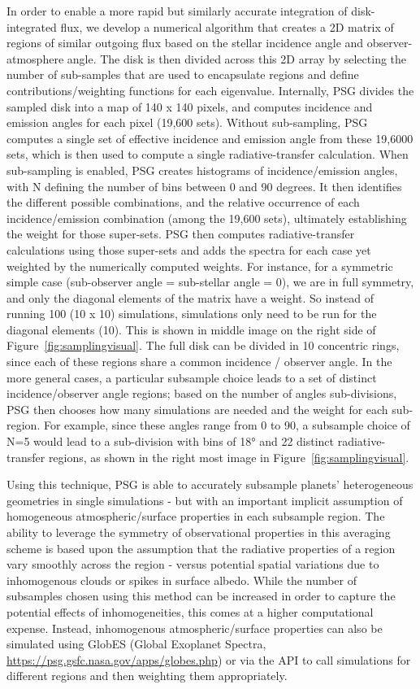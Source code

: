\documentclass[12pt, letterpaper]{aastex631}
\begin{document}
 In order to enable a more rapid but similarly accurate integration of disk-integrated flux, we develop a numerical algorithm that creates a 2D matrix of regions of similar outgoing flux based on the stellar incidence angle and observer-atmosphere angle. The disk is then divided across this 2D array by selecting the number of sub-samples that are used to encapsulate regions and define contributions/weighting functions for each eigenvalue. Internally, PSG divides the sampled disk into a map of 140 x 140 pixels, and computes incidence and emission angles for each pixel (19,600 sets). Without sub-sampling, PSG computes a single set of effective incidence and emission angle from these 19,6000 sets, which is then used to compute a single radiative-transfer calculation. When sub-sampling is enabled, PSG creates histograms of incidence/emission angles, with N defining the number of bins between 0 and 90 degrees. It then identifies the different possible combinations, and the relative occurrence of each incidence/emission combination (among the 19,600 sets), ultimately establishing the weight for those super-sets. PSG then computes radiative-transfer calculations using those super-sets and adds the spectra for each case yet weighted by the numerically computed weights. For instance, for a symmetric simple case (sub-observer angle = sub-stellar angle = 0), we are in full symmetry, and only the diagonal elements of the matrix have a weight. So instead of running 100 (10 x 10) simulations, simulations only need to be run for the diagonal elements (10). This is shown in middle image on the right side of Figure~\ref{fig:samplingvisual}. The full disk can be divided in 10 concentric rings, since each of these regions share a common incidence / observer angle.  In the more general cases, a particular subsample choice leads to a set of distinct incidence/observer angle regions; based on the number of angles sub-divisions, PSG then chooses how many simulations are needed and the weight for each sub-region. For example, since these angles range from 0 to 90, a subsample choice of N=5 would lead to a sub-division with bins of 18° and 22 distinct radiative-transfer regions, as shown in the right most image in Figure~\ref{fig:samplingvisual}.  
 
 Using this technique, PSG is able to accurately subsample planets' heterogeneous geometries in single simulations - but with an important implicit assumption of homogeneous atmospheric/surface properties in each subsample region.  The ability to leverage the symmetry of observational properties in this averaging scheme is based upon the assumption that the radiative properties of a region vary smoothly across the region - versus potential spatial variations due to inhomogenous clouds or spikes in surface albedo.  While the number of subsamples chosen using this method can be increased in order to capture the potential effects of inhomogeneities, this comes at a higher computational expense. Instead, inhomogenous atmospheric/surface properties can also be simulated using GlobES (Global Exoplanet Spectra, \url{https://psg.gsfc.nasa.gov/apps/globes.php}) or via the API to call simulations for different regions and then weighting them appropriately.
 
\end{document}
